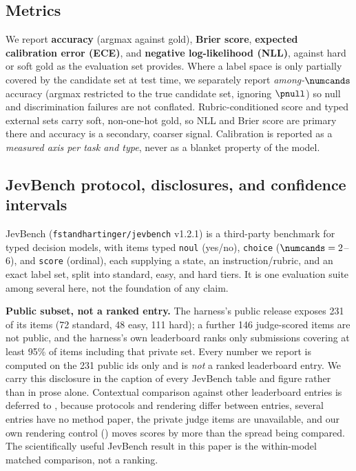 \subsection{Metrics}
\label{sec:experiments:metrics}

We report \textbf{accuracy} (argmax against gold), \textbf{Brier score}, \textbf{expected calibration
error (ECE)}, and \textbf{negative log-likelihood (NLL)}, against hard or soft gold as the evaluation set
provides. Where a label space is only partially covered by the candidate set at test time, we separately
report \emph{among-$\numcands$} accuracy (argmax restricted to the true candidate set, ignoring $\pnull$)
so null and discrimination failures are not conflated. Rubric-conditioned score and typed external sets
carry soft, non-one-hot gold, so NLL and Brier score are primary there and accuracy is a secondary,
coarser signal. Calibration is reported as a \emph{measured axis per task and type}, never as a blanket
property of the model.

\subsection{JevBench protocol, disclosures, and confidence intervals}
\label{sec:experiments:jevbench}

JevBench (\texttt{fstandhartinger/jevbench} v1.2.1) is a third-party benchmark for typed decision models,
with items typed \texttt{noul} (yes/no), \texttt{choice} ($\numcands=2$--6), and \texttt{score}
(ordinal), each supplying a state, an instruction/rubric, and an exact label set, split into standard,
easy, and hard tiers. It is one evaluation suite among several here, not the foundation of any claim.

\textbf{Public subset, not a ranked entry.} The harness's public release exposes 231 of its items (72
standard, 48 easy, 111 hard); a further 146 judge-scored items are not public, and the harness's own
leaderboard ranks only submissions covering at least 95\% of items including that private set. Every
number we report is computed on the 231 public ids only and is \emph{not} a ranked leaderboard entry.
We carry this disclosure in the caption of every JevBench table and figure rather than in prose alone.
Contextual comparison against other leaderboard entries is deferred to , because
protocols and rendering differ between entries, several entries have no method paper, the private judge
items are unavailable, and our own rendering control () moves scores by
more than the spread being compared. The scientifically useful JevBench result in this paper is the
within-model matched comparison, not a ranking.

